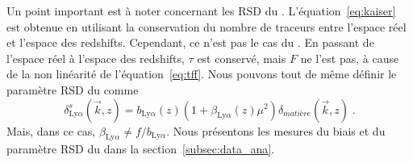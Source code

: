 Un point important est à noter concernant les RSD du \lya{}.
L'équation~\ref{eq:kaiser} est obtenue en utilisant la conservation du nombre de traceurs entre l'espace réel et l'espace des redshifts. Cependant, ce n'est pas le cas du \lya{}.
En passant de l'espace réel à l'espace des redshifts, $\tau$ est conservé, mais $F$ ne l'est pas, à cause de la non linéarité de l'équation~\ref{eq:tff}.
Nous pouvons tout de même définir le paramètre RSD du \lya{} comme
\begin{equation}
  \label{eq:kaiser4}
  \delta_{\mathrm{Ly}\alpha}^{s}(\vec k, z) = b_{\mathrm{Ly}\alpha}(z) (1+ \beta_{\mathrm{Ly}\alpha}(z) \mu^2) \delta_{matière}(\vec k, z)   \; .
\end{equation}
Mais, dans ce cas, $ \beta_{\mathrm{Ly}\alpha} \neq f / b_{\mathrm{Ly}\alpha}$.
Nous présentons les mesures du biais et du paramètre RSD du \lya{} dans la section~\ref{subsec:data_ana}.

